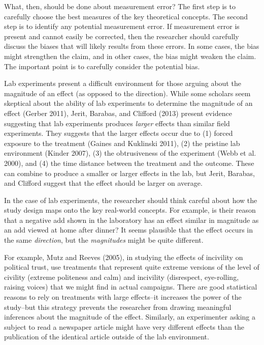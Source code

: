 \documentclass[12pt]{article}
\begin{document}

What, then, should be done about measurement error? The first step is to carefully choose the best measures of the key theoretical concepts. The second step is to identify any potential measurement error. If measurement error is present and cannot easily be corrected, then the researcher should carefully discuss the biases that will likely results from these errors. In some cases, the bias might strengthen the claim, and in other cases, the bias might weaken the claim. The important point is to carefully consider the potential bias.


Lab experiments present a difficult environment for those arguing about the magnitude of an effect (as opposed to the direction). While some scholars seem skeptical about the ability of lab experiments to determine the magnitude of an effect (Gerber 2011), Jerit, Barabas, and Clifford (2013) present evidence suggesting that lab experiments produces \textit{larger} effects than similar field experiments. They suggests that the larger effects occur due to (1) forced exposure to the treatment (Gaines and Kuklinski 2011), (2) the pristine lab environment (Kinder 2007), (3) the obtrusiveness of the experiment (Webb et al. 2000), and (4) the time distance between the treatment and the outcome. These can combine to produce a smaller or larger effects in the lab, but Jerit, Barabas, and Clifford suggest that the effect should be larger on average.

In the case of lab experiments, the researcher should think careful about how the study design maps onto the key real-world concepts. For example, is their reason that a negative add shown in the laboratory has an effect similar in magnitude as an add viewed at home after dinner? It seems plausible that the effect occurs in the same \emph{direction}, but the \emph{magnitudes} might be quite different.

For example, Mutz and Reeves (2005), in studying the effects of incivility on political trust, use treatments that represent quite extreme versions of the level of civility (extreme politeness and calm) and incivility (disrespect, eye-rolling, raising voices) that we might find in actual campaigns. There are good statistical reasons to rely on treatments with large effects--it increases the power of the study--but this strategy prevents the researcher from drawing meaningful inferences about the magnitude of the effect. Similarly, an experimenter asking a subject to read a newspaper article might have very different effects than the publication of the identical article outside of the lab environment.
\end{document}
